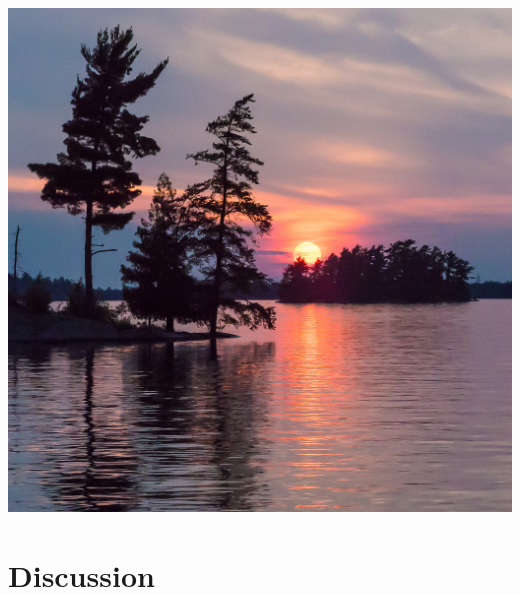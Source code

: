 \documentclass[compress,english]{beamer}
\begin{document}

{\usebackgroundtemplate%
	{\includegraphics[width=\paperwidth]{FloodedSunset}}
\section{Discussion}
}
\end{document}
